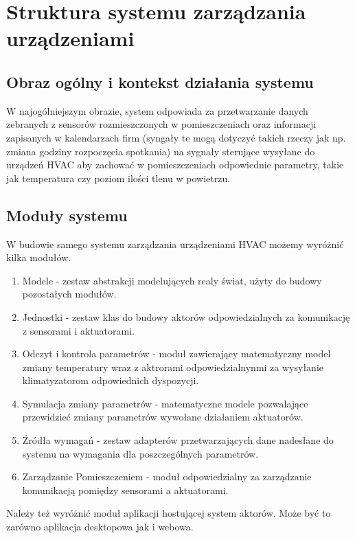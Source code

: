 \chapter{Struktura systemu zarządzania urządzeniami}

\section{Obraz ogólny i kontekst działania systemu}

W najogólniejszym obrazie, system odpowiada za przetwarzanie danych zebranych z sensorów rozmieszczonych w pomieszczeniach oraz informacji zapisanych w kalendarzach firm (syngały te mogą dotyczyć takich rzeczy jak np. zmiana godziny rozpoczęcia spotkania) na sygnały sterujące wysyłane do urządzeń HVAC aby zachować w pomieszczeniach odpowiednie parametry, takie jak temperatura czy poziom ilości tlenu w powietrzu. 

\section{Moduły systemu}
W budowie samego systemu zarządzania urządzeniami HVAC możemy wyróżnić kilka modułów.
\begin{enumerate}
    \item Modele - zestaw abstrakcji modelujących realy świat, użyty do budowy pozostałych modułów.  
    \item Jednostki - zestaw klas do budowy aktorów odpowiedzialnych za komunikację z sensorami i aktuatorami.
    \item Odczyt i kontrola parametrów - moduł zawierający matematyczny model zmiany temperatury wraz z aktrorami odpowiedzialnynmi za wysyłanie klimatyzatorom odpowiednich dyspozycji.
    \item Symulacja zmiany parametrów - matematyczne modele pozwalające przewidzieć zmiany parametrów wywołane działaniem aktuatorów.
    \item Źródła wymagań - zestaw adapterów przetwarzających dane nadesłane do systemu na wymagania dla poszczególnych parametrów. 
    \item Zarządzanie Pomieszczeniem - moduł odpowiedzialny za zarządzanie komunikacją pomiędzy sensorami a aktuatorami. 
\end{enumerate}

Należy też wyróżnić moduł aplikacji hostującej system aktorów. 
Może być to zarówno aplikacja desktopowa jak i webowa. 

